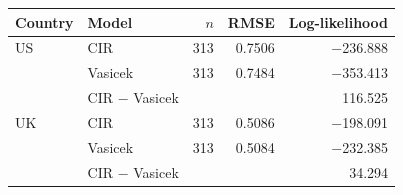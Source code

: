 \begin{tabular}{llrrr}
\toprule
Country & Model & $n$ & RMSE & Log-likelihood \\
\midrule
US & CIR & 313 & 0.7506 & \ensuremath{-}236.888 \\
 & Vasicek & 313 & 0.7484 & \ensuremath{-}353.413 \\
 & CIR $-$ Vasicek & & & 116.525 \\
\midrule
UK & CIR & 313 & 0.5086 & \ensuremath{-}198.091 \\
 & Vasicek & 313 & 0.5084 & \ensuremath{-}232.385 \\
 & CIR $-$ Vasicek & & & 34.294 \\
\bottomrule
\end{tabular}
